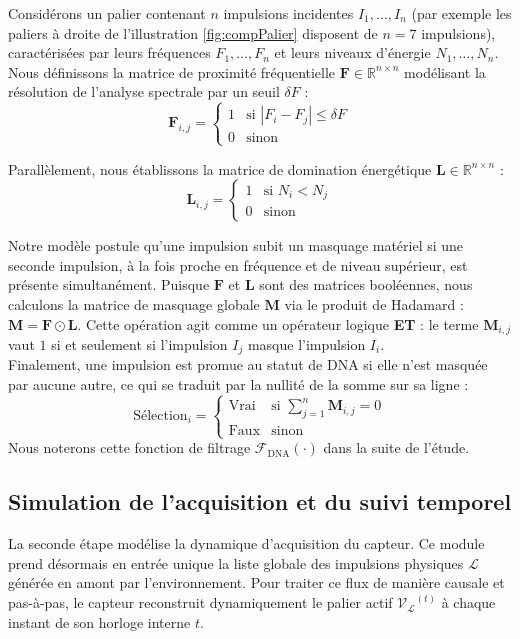 Considérons un palier contenant $n$ impulsions incidentes $I_1, \dots, I_n$ (par exemple les paliers à droite de l'illustration \ref{fig:compPalier} disposent de $n=7$ impulsions), caractérisées par leurs fréquences $F_1, \dots, F_n$ et leurs niveaux d'énergie $N_1, \dots, N_n$. Nous définissons la matrice de proximité fréquentielle $\mathbf{F} \in \mathbb{R}^{n \times n}$ modélisant la résolution de l'analyse spectrale par un seuil $\delta F$ :
\begin{equation}
\mathbf{F}_{i,j} = \begin{cases}
1 & \text{si } |F_i - F_j| \le \delta F \\
0 & \text{sinon}
\end{cases}
\end{equation} 

Parallèlement, nous établissons la matrice de domination énergétique $\mathbf{L} \in \mathbb{R}^{n \times n}$ :
\begin{equation}
\mathbf{L}_{i,j} = \begin{cases}
1 & \text{si } N_i < N_j \\
0 & \text{sinon}
\end{cases}
\end{equation}

Notre modèle postule qu'une impulsion subit un masquage matériel si une seconde impulsion, à la fois proche en fréquence et de niveau supérieur, est présente simultanément. Puisque $\mathbf{F}$ et $\mathbf{L}$ sont des matrices booléennes, nous calculons la matrice de masquage globale $\mathbf{M}$ via le produit de Hadamard : $\mathbf{M} = \mathbf{F} \odot \mathbf{L}$. Cette opération agit comme un opérateur logique \textbf{ET} : le terme $\mathbf{M}_{i,j}$ vaut $1$ si et seulement si l'impulsion $I_j$ masque l'impulsion $I_i$.  \\

Finalement, une impulsion est promue au statut de DNA si elle n'est masquée par aucune autre, ce qui se traduit par la nullité de la somme sur sa ligne :
\begin{equation}
\text{Sélection}_i= \begin{cases}
\text{Vrai} & \text{si } \sum_{j=1}^{n} \mathbf{M}_{i,j} = 0 \\
\text{Faux} & \text{sinon}
\end{cases}
\end{equation}
Nous noterons cette fonction de filtrage $\mathcal{F}_{\text{DNA}}(\cdot)$ dans la suite de l'étude.


\subsection{Simulation de l'acquisition et du suivi temporel}
\label{seq:DCISsuivi}
La seconde étape modélise la dynamique d'acquisition du capteur. Ce module prend désormais en entrée unique la liste globale des impulsions physiques $\mathcal{L}$ générée en amont par l'environnement. Pour traiter ce flux de manière causale et pas-à-pas, le capteur reconstruit dynamiquement le palier actif $\mathcal{V_L}^{(t)}$ à chaque instant de son horloge interne $t$. \\

